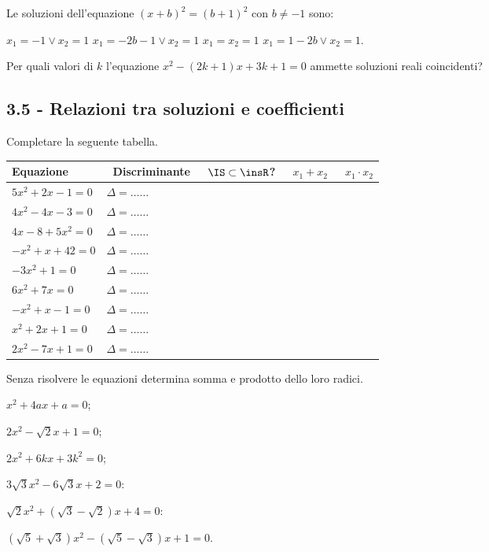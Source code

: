 \begin{esercizio}[\Ast]
 \label{ese:3.76}
Le soluzioni dell'equazione $(x + b)^{2} = (b + 1)^{2}$ con $b \neq-1$ sono:

\boxA \;$x_{1} =-1\vee x _{2} = 1$
\boxB \;$x_{1} =-2 b-1 \vee x_{2} = 1$
\boxC \;$x_{1} = x_{2} = 1$
\boxD \;$x_{1} = 1-2 b \vee x_{2} = 1$.
\end{esercizio}

\begin{esercizio}
 \label{ese:3.77}
Per quali valori di $k$ l'equazione $x^{2}-(2 k + 1) x + 3 k + 1=0$ ammette soluzioni reali coincidenti?
\end{esercizio}
\pagebreak
\subsection*{3.5 - Relazioni tra soluzioni e coefficienti}

\begin{esercizio}
 \label{ese:3.78}
Completare la seguente tabella.

 \begin{tabular*}{.9\textwidth}{@{\extracolsep{\fill}}*{5}{l}}
 \toprule
 Equazione &~Discriminante&~$\IS\subset\insR$? &~$x_1 + x_2$ &~$x_1 \cdot x_2$\\
\midrule
 $5 x^{2} + 2 x-1 = 0$& $\Delta=\ldots \ldots$ & &	&\\
 $4 x^{2} - 4 x-3 = 0$& $\Delta=\ldots \ldots$ & &	&\\
 $4 x -8 + 5 x^{2} = 0$& $\Delta=\ldots \ldots$ & &	&\\
 $-x^{2} + x+42 = 0$& $\Delta=\ldots \ldots$ & &	&\\
 $- 3 x^{2} + 1 = 0$&$\Delta=\ldots \ldots$ & &	&\\
 $6 x^{2} + 7 x = 0$&$\Delta=\ldots \ldots$ & &	&\\
 $- x^{2} + x-1 = 0$&$\Delta=\ldots \ldots$ & &	&\\
 $x^{2} + 2 x + 1 = 0$&$\Delta=\ldots \ldots$ & &	&\\
 $2 x^{2}-7 x + 1 = 0$&$\Delta=\ldots \ldots $ & &	&\\
\bottomrule
 \end{tabular*}
\end{esercizio}

\begin{esercizio}
 \label{ese:3.79}
Senza risolvere le equazioni determina somma e prodotto dello loro radici.
\begin{multicols}{2}
\begin{enumeratea}
\item $x^{2} + 4ax + a = 0$;
\item $2x^{2}-\sqrt{2} x + 1 = 0$;
\item $2x^{2} + 6kx + 3k^{2} = 0$;
\item $3 \sqrt{3} x^{2}-6 \sqrt{3} x + 2 = 0$:
\item $\sqrt{2} x^{2} + (\sqrt{3}-\sqrt{2}) x + 4 = 0$:
\item $(\sqrt{5} + \sqrt{3}) x^{2}-(\sqrt{5}-\sqrt{3}) x + 1= 0$.
\end{enumeratea}
\end{multicols}
\end{esercizio}

